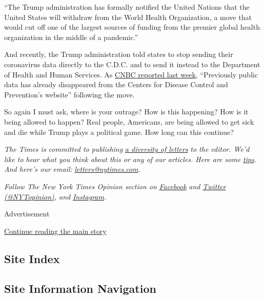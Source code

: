 ``The Trump administration has formally notified the United Nations that
the United States will withdraw from the World Health Organization, a
move that would cut off one of the largest sources of funding from the
premier global health organization in the middle of a pandemic.''

And recently, the Trump administration told states to stop sending their
coronavirus data directly to the C.D.C. and to send it instead to the
Department of Health and Human Services. As
\href{https://www.cnbc.com/2020/07/16/us-coronavirus-data-has-already-disappeared-after-trump-administration-shifted-control-from-cdc-to-hhs.html}{CNBC
reported last week}, ``Previously public data has already disappeared
from the Centers for Disease Control and Prevention's website''
following the move.

So again I must ask, where is your outrage? How is this happening? How
is it being allowed to happen? Real people, Americans, are being allowed
to get sick and die while Trump plays a political game. How long can
this continue?

\emph{The Times is committed to publishing}
\href{https://www.nytimes.com/2019/01/31/opinion/letters/letters-to-editor-new-york-times-women.html}{\emph{a
diversity of letters}} \emph{to the editor. We'd like to hear what you
think about this or any of our articles. Here are some}
\href{https://help.nytimes.com/hc/en-us/articles/115014925288-How-to-submit-a-letter-to-the-editor}{\emph{tips}}\emph{.
And here's our email:}
\href{mailto:letters@nytimes.com}{\emph{letters@nytimes.com}}\emph{.}

\emph{Follow The New York Times Opinion section on}
\href{https://www.facebook.com/nytopinion}{\emph{Facebook}} \emph{and}
\href{http://twitter.com/NYTOpinion}{\emph{Twitter
(@NYTopinion)}}\emph{, and}
\href{https://www.instagram.com/nytopinion/}{\emph{Instagram}}\emph{.}

Advertisement

\protect\hyperlink{after-bottom}{Continue reading the main story}

\hypertarget{site-index}{%
\subsection{Site Index}\label{site-index}}

\hypertarget{site-information-navigation}{%
\subsection{Site Information
Navigation}\label{site-information-navigation}}

